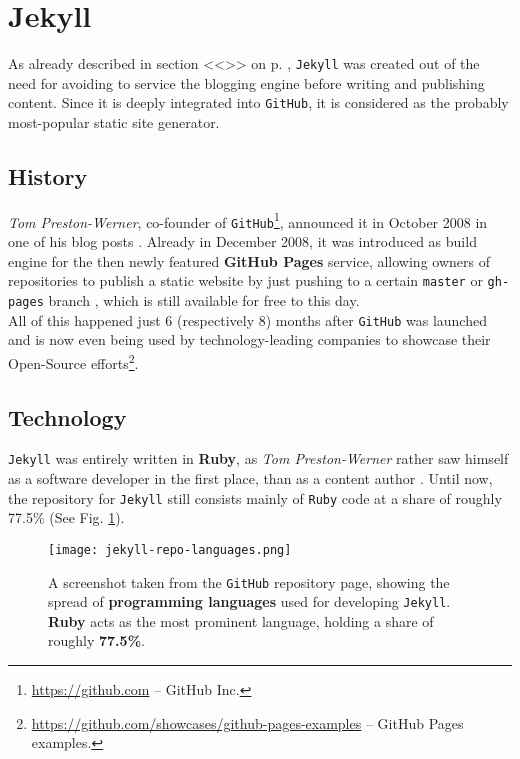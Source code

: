 \section{Jekyll}
\label{sec:jekyll}

As already described in section <<\emph{}>> on p. \pageref{par:creatingcontent}, \texttt{Jekyll} was created out of the need for avoiding to service the blogging engine before writing and publishing content. Since it is deeply integrated into \texttt{GitHub}, it is considered as the probably most-popular static site generator.

\subsection{History}
\label{sec:jekyll-history}
\emph{Tom Preston-Werner}, co-founder of \texttt{GitHub}\footnote{\url{https://github.com} -- GitHub Inc.}, announced it in October 2008 in one of his blog posts \cite{PrestonWerner2008jekyll}. Already in December 2008, it was introduced as build engine for the then newly featured \textbf{GitHub Pages} service, allowing owners of repositories to publish a static website by just pushing to a certain \texttt{master} or \texttt{gh-pages} branch \cite{PrestonWerner2008githubpages}, which is still available for free to this day.\\
All of this happened just 6 (respectively 8) months after \texttt{GitHub} was launched \cite{PrestonWerner2008githublaunch} and is now even being used by technology-leading companies to showcase their Open-Source efforts\footnote{\url{https://github.com/showcases/github-pages-examples} -- GitHub Pages examples.}.

\subsection{Technology}
\label{sec:jekyll-technology}
\texttt{Jekyll} was entirely written in \textbf{Ruby}, as \emph{Tom Preston-Werner} rather saw himself as a software developer in the first place, than as a content author \cite{PrestonWerner2008jekyll}. Until now, the repository for \texttt{Jekyll} still consists mainly of \texttt{Ruby} code at a share of roughly 77.5\% (See Fig. \ref{fig:jekyll-languages}).

\begin{figure}
    \centering
    \texttt{[image: jekyll-repo-languages.png]}
    \caption{A screenshot taken from the \texttt{GitHub} repository page, showing the spread of \textbf{programming languages} used for developing \texttt{Jekyll}. \textbf{Ruby} acts as the most prominent language, holding a share of roughly \textbf{77.5\%}.}
    \label{fig:jekyll-languages}
\end{figure}
%

